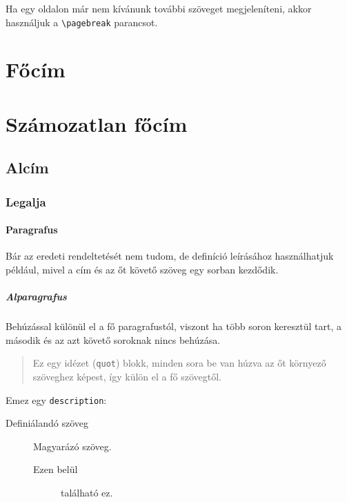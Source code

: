 \documentclass[a4paper]{report}             %
\begin{document}
Ha egy oldalon már nem kívánunk további szöveget megjeleníteni, akkor
használjuk a \verb"\pagebreak" parancsot.

\pagebreak

\section{Főcím}
\section*{Számozatlan főcím}
\subsection{Alcím}
\subsubsection{Legalja}

\paragraph{Paragrafus}

Bár az eredeti rendeltetését nem tudom, de definíció leírásához használhatjuk
például, mivel a cím és az őt követő szöveg egy sorban kezdődik.

\subparagraph{Alparagrafus}

Behúzással különül el a fő paragrafustól, viszont ha több soron keresztül
tart, a második és az azt követő soroknak nincs behúzása.

\begin{quote}

    Ez egy idézet (\verb"quot") blokk, minden sora be van húzva az őt környező
    szöveghez képest, így külön el a fő szövegtől.

\end{quote}

Emez egy \verb"description":

\begin{description}
    \item[Definiálandó szöveg] Magyarázó szöveg.
    \begin{description}
        \item[Ezen belül] található ez.
    \end{description}
\end{description}

\end{document}
